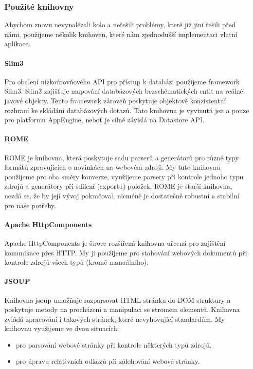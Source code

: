 \subsubsection{Použité knihovny}

Abychom znovu nevynalézali kolo a neřešili problémy, které již jiní řešili před námi, použijeme několik knihoven, které nám zjednodušší implementaci vlatní aplikace.

\paragraph{Slim3}
Pro obalení nízkoúrovňového API pro přístup k databázi použijeme framework Slim3.
Slim3 zajišťuje mapování databázových bezschématických entit na reálné javové objekty.
Tento framework zároveň poskytuje objektově konzistentní rozhraní ke skládání databázových dotazů.
Tato knihovna je vyvinutá jen a pouze pro platformu AppEngine, neboť je silně závislá na Datastore API.

\paragraph{ROME}
ROME je knihovna, která poskytuje sadu parserů a generátorů pro různé typy formátů zpravujících o novinkách na webovém zdroji.
My tuto knihovnu použijeme pro oba směry konverze, využijeme parsery při kontrole jednoho typu zdrojů a generátory při sdílení (exportu) položek.
ROME je starší knihovna, nezdá se, že by její vývoj pokračoval, nicméně je dostatečně robustní a stabilní pro naše potřeby.

\paragraph{Apache HttpComponents}
Apache HttpComponents je široce rozšířená kni\-hov\-na uřcená pro zajištění komunikace přes HTTP.
My ji použijeme pro stahování webových dokumentů při kontrole zdrojů všech typů (kromě manuálního).

\paragraph{JSOUP}
Knihovna jsoup umožňuje rozparsovat HTML stránku do DOM struktury a poskytuje metody na procházení a manipulaci se stromem elementů.
Knihovna zvládá zpracování i takových stránek, které nevyhovující standardům.
My knihovnu využijeme ve dvou situacích:
\begin{itemize}
	\item pro parsování webové stránky při kontrole některých typů zdrojů,
	\item pro úpravu relativních odkazů při zálohování webové stránky.
\end{itemize}

